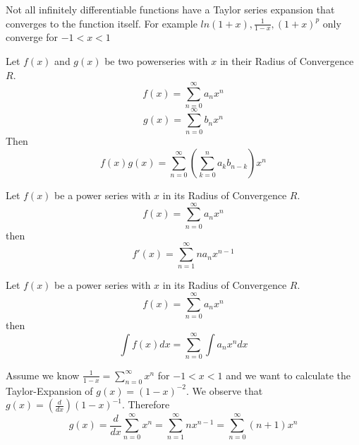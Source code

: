 \begin{important}
    Not all infinitely differentiable functions have a Taylor series expansion that converges to the function itself. For example $ln(1+x), \frac{1}{1-x}, (1+x)^p$ only converge for $-1 \lt x \lt 1$
\end{important}

\begin{theorem}
    Let $f(x)$ and $g(x)$ be two powerseries with $x$ in their Radius of Convergence $R$.
    $$f(x) = \sum_{n=0}^\infty a_n x^n$$ 
    $$g(x) = \sum_{n=0}^\infty b_n x^n$$
    Then
    $$f(x)g(x) = \sum_{n=0}^\infty \left(\sum_{k=0}^n a_k b_{n-k}\right) x^n$$
\end{theorem}

\begin{theorem}
    Let $f(x)$ be a power series with $x$ in its Radius of Convergence $R$.
    $$f(x) = \sum_{n=0}^\infty a_n x^n$$
    then
    $$f'(x) = \sum_{n=1}^\infty n a_n x^{n-1}$$
\end{theorem}

\begin{theorem}
    Let $f(x)$ be a power series with $x$ in its Radius of Convergence $R$.
    $$f(x) = \sum_{n=0}^\infty a_n x^n$$
    then
    $$\int f(x) dx = \sum_{n=0}^\infty \int a_n x^n dx$$
\end{theorem}

\begin{example}
    Assume we know $\frac{1}{1-x} = \sum_{n=0}^\infty x^n$ for $-1 \lt x \lt 1$ and we want to calculate the Taylor-Expansion of $g(x) = (1-x)^{-2}$.
    We observe that $g(x) = (\frac{d}{dx}) (1-x)^{-1}$. Therefore 
    $$g(x) = \frac{d}{dx} \sum_{n=0}^\infty x^n = \sum_{n=1}^\infty n x^{n-1} = \sum_{n=0}^\infty (n+1)x^n$$
\end{example}
